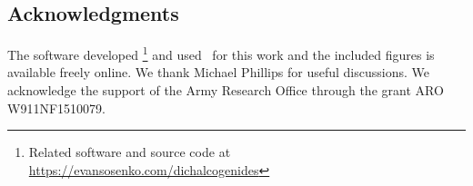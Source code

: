 \begin{acknowledgments}
  \section{Acknowledgments}

  The software developed %
\footnote{%
  Related software and source code at \\
  \url{https://evansosenko.com/dichalcogenides}
}
  and used~\cite{Hunter:2007} for this work
  and the included figures is available freely online.
  We thank Michael Phillips for useful discussions.
  We acknowledge the support of the Army Research Office through the grant
  ARO W911NF1510079.
\end{acknowledgments}

